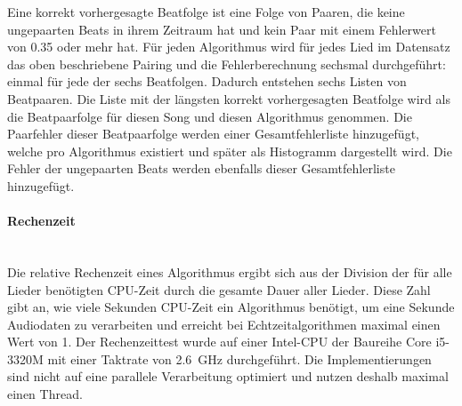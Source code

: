 {{{			%
			Eine korrekt vorhergesagte Beatfolge ist eine Folge von Paaren,
				die keine ungepaarten Beats in ihrem Zeitraum hat und
				kein Paar mit einem Fehlerwert von \num{0.35} oder mehr hat.
			Für jeden Algorithmus wird für jedes Lied im Datensatz das oben beschriebene Pairing und die Fehlerberechnung
				sechsmal durchgeführt:
				einmal für jede der sechs Beatfolgen.
			Dadurch entstehen sechs Listen von Beatpaaren.
			Die Liste mit der längsten korrekt vorhergesagten Beatfolge
				wird als die Beatpaarfolge für diesen Song und diesen Algorithmus genommen.
			Die Paarfehler dieser Beatpaarfolge werden einer Gesamtfehlerliste hinzugefügt,
				welche pro Algorithmus existiert und später als Histogramm dargestellt wird.
			Die Fehler der ungepaarten Beats werden ebenfalls dieser Gesamtfehlerliste hinzugefügt.
		}

		\paragraph{\large Rechenzeit} \mbox{}\vspace{3mm}\\
		{
			Die relative Rechenzeit eines Algorithmus ergibt sich aus der Division der für alle Lieder benötigten \acs{CPU}-Zeit durch die gesamte Dauer aller Lieder.
			Diese Zahl gibt an,
				wie viele Sekunden \acs{CPU}-Zeit ein Algorithmus benötigt,
				um eine Sekunde Audiodaten zu verarbeiten
				und erreicht bei Echtzeitalgorithmen maximal einen Wert von \num{1}.
			Der Rechenzeittest wurde auf einer Intel-\ac{CPU} der Baureihe Core i5-3320M mit einer Taktrate von \SI{2.6}{\giga\hertz} durchgeführt.
			Die Implementierungen sind nicht auf eine parallele Verarbeitung optimiert
				und nutzen deshalb maximal einen Thread.
		}
	}
}
